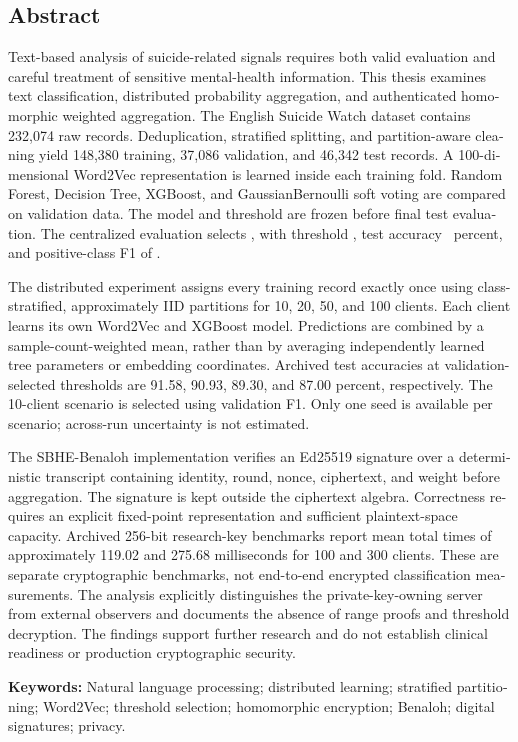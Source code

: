 \cleardoublepage
\begin{latin}
\chapter*{Abstract}
\begingroup
{}
Text-based analysis of suicide-related signals requires both valid evaluation and
careful treatment of sensitive mental-health information. This thesis examines
text classification, distributed probability aggregation, and authenticated
homomorphic weighted aggregation. The English Suicide Watch dataset contains
232,074 raw records. Deduplication, stratified splitting, and partition-aware
cleaning yield 148,380 training, 37,086 validation, and 46,342 test records.
A 100-dimensional Word2Vec representation is learned inside each training fold.
Random Forest, Decision Tree, XGBoost, and Gaussian\lr{--}Bernoulli soft voting are
compared on validation data. The model and threshold are frozen before final test
evaluation. The centralized evaluation selects \BestModelEnglish, with threshold
\BestThreshold, test accuracy \BestTestAccuracyPercent\ percent, and positive-class
F1 of \BestTestFone.

The distributed experiment assigns every training record exactly once using
class-stratified, approximately IID partitions for 10, 20, 50, and 100 clients.
Each client learns its own Word2Vec and XGBoost model. Predictions are combined by
a sample-count-weighted mean, rather than by averaging independently learned
tree parameters or embedding coordinates. Archived test accuracies at
validation-selected thresholds are 91.58, 90.93, 89.30, and 87.00 percent,
respectively. The 10-client scenario is selected using validation F1. Only one
seed is available per scenario; across-run uncertainty is not estimated.

The SBHE-Benaloh implementation verifies an Ed25519 signature over a deterministic
transcript containing identity, round, nonce, ciphertext, and weight before
aggregation. The signature is kept outside the ciphertext algebra. Correctness
requires an explicit fixed-point representation and sufficient plaintext-space
capacity. Archived 256-bit research-key benchmarks report mean total times of
approximately 119.02 and 275.68 milliseconds for 100 and 300 clients. These are
separate cryptographic benchmarks, not end-to-end encrypted classification
measurements. The analysis explicitly distinguishes the private-key-owning
server from external observers and documents the absence of range proofs and
threshold decryption. The findings support further research and do not establish
clinical readiness or production cryptographic security.

\medskip\noindent
\textbf{Keywords:} Natural language processing; distributed learning;
stratified partitioning; Word2Vec; threshold selection; homomorphic encryption;
Benaloh; digital signatures; privacy.
\par\endgroup
\end{latin}

